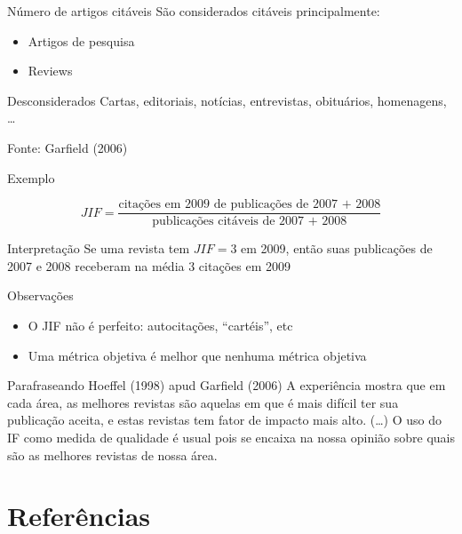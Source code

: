 \documentclass{beamer}
\begin{document}
\begin{frame}{Número de artigos citáveis}
São considerados citáveis principalmente:
  \begin{itemize}
  \item Artigos de pesquisa
  \item Reviews
  \end{itemize}
  \begin{block}{Desconsiderados}
    Cartas, editoriais, notícias, entrevistas, obituários, homenagens, \ldots
  \end{block}

  \vfill
  Fonte: Garfield (2006)
\end{frame}

\begin{frame}{Exemplo}
  \begin{example}
    \begin{displaymath}
      JIF = \frac{\text{citações em 2009 de publicações de 2007 + 2008}}{\text{publicações citáveis de 2007 + 2008}}
    \end{displaymath}
  \end{example}
  \begin{block}{Interpretação}
    Se uma revista tem $JIF=3$ em 2009, então suas publicações de 2007 e 2008 receberam na média 3 citações em 2009
  \end{block}
\end{frame}

\begin{frame}{Observações}
  \begin{itemize}
  \item O JIF não é perfeito: autocitações, ``cartéis'', etc
  \item Uma métrica objetiva é melhor que nenhuma métrica objetiva

  \end{itemize}
  \begin{block}{Parafraseando Hoeffel (1998) apud Garfield (2006)}
A experiência mostra que em cada área, as melhores revistas são aquelas em que é mais difícil ter sua publicação aceita, e estas revistas tem fator de impacto mais alto. (\ldots) O uso do IF como medida de qualidade é usual pois se encaixa na nossa opinião sobre quais são as melhores revistas de nossa área.
  \end{block}
\end{frame}

\section{Referências}
\end{document}
